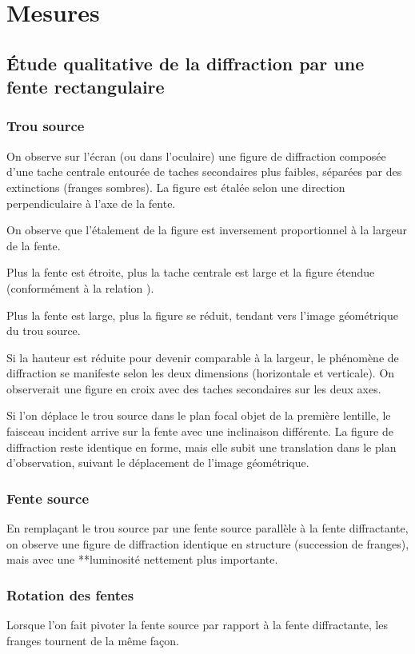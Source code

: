 \documentclass[a4paper,9pt,french]{scrartcl}
\begin{document}
\section{Mesures}
\subsection{Étude qualitative de la diffraction par une fente rectangulaire}
\subsubsection{Trou source}
On observe sur l'écran (ou dans l'oculaire) une figure de diffraction composée d'une tache centrale  entourée de taches secondaires plus faibles, séparées par des extinctions (franges sombres). La figure est étalée selon une direction perpendiculaire à l'axe de la fente.

On observe que l'étalement de la figure est inversement proportionnel à la largeur  de la fente.

Plus la fente est étroite, plus la tache centrale est large et la figure étendue (conformément à la relation ).

Plus la fente est large, plus la figure se réduit, tendant vers l'image géométrique du trou source.

Si la hauteur est réduite pour devenir comparable à la largeur, le phénomène de diffraction se manifeste selon les deux dimensions (horizontale et verticale). On observerait une figure en croix avec des taches secondaires sur les deux axes.

Si l'on déplace le trou source dans le plan focal objet de la première lentille, le faisceau incident arrive sur la fente avec une inclinaison différente. La figure de diffraction reste identique en forme, mais elle subit une translation dans le plan d'observation, suivant le déplacement de l'image géométrique.

\subsubsection{Fente source}
En remplaçant le trou source par une fente source parallèle à la fente diffractante, on observe une figure de diffraction identique en structure (succession de franges), mais avec une **luminosité nettement plus importante.
\subsubsection{Rotation des fentes}
Lorsque l'on fait pivoter la fente source par rapport à la fente diffractante, les franges tournent de la m\^eme façon.
\end{document}
